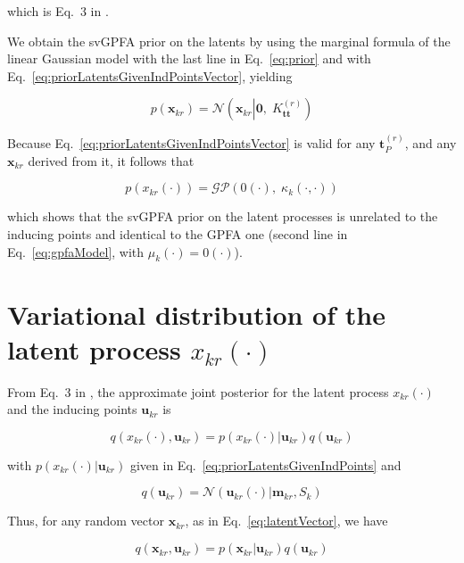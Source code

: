 \documentclass[12pt]{article}
\begin{document}
\noindent which is Eq.~3 in \citet{dunckerAndSahani18}.

We obtain the svGPFA prior on the latents by using the marginal formula of the
linear Gaussian model \citep[][Eq.~2.115]{bishop06} with the last line in
Eq.~\ref{eq:prior} and with Eq.~\ref{eq:priorLatentsGivenIndPointsVector},
yielding

\begin{equation}
    p(\mathbf{x}_{kr})=\mathcal{N}\left(\mathbf{x}_{kr}\left|\mathbf{0},\;K_\mathbf{tt}^{(r)}\right.\right)
    \label{eq:latentsPriorVector}
\end{equation}

Because Eq.~\ref{eq:priorLatentsGivenIndPointsVector} is valid for any
$\mathbf{t}_P^{(r)}$, and any $\mathbf{x}_{kr}$ derived from it, it follows that

\begin{equation*}
    p(x_{kr}(\cdot))=\mathcal{GP}\left(0(\cdot),\;\kappa_k(\cdot,\cdot)\right)
\end{equation*}

\noindent which shows that the svGPFA prior on the latent processes is
unrelated to the inducing points and identical to the GPFA one (second line in
Eq.~\ref{eq:gpfaModel}, with $\mu_k(\cdot)=0(\cdot)$).

\section{Variational distribution of the latent process $x_{kr}(\cdot)$}

From Eq.~3 in \citet[][supplementary]{dunckerAndSahani18}, the approximate joint
posterior for the latent process $x_{kr}(\cdot)$ and the inducing points
$\mathbf{u}_{kr}$ is

\begin{equation}
    q(x_{kr}(\cdot),\mathbf{u}_{kr})=p(x_{kr}(\cdot)|\mathbf{u}_{kr})q(\mathbf{u}_{kr})
\end{equation}

\noindent with $p(x_{kr}(\cdot)|\mathbf{u}_{kr})$ given in Eq.~\ref{eq:priorLatentsGivenIndPoints} and

\begin{equation}
    q(\mathbf{u}_{kr})=\mathcal{N}(\mathbf{u}_{kr}(\cdot)|\mathbf{m}_{kr}, S_k)
    \label{eq:qu}
\end{equation}

Thus, for any random vector $\mathbf{x}_{kr}$, as in Eq.~\ref{eq:latentVector},
we have

\begin{equation}
    q(\mathbf{x}_{kr},\mathbf{u}_{kr})=p(\mathbf{x}_{kr}|\mathbf{u}_{kr})q(\mathbf{u}_{kr})
\end{equation}
\end{document}

